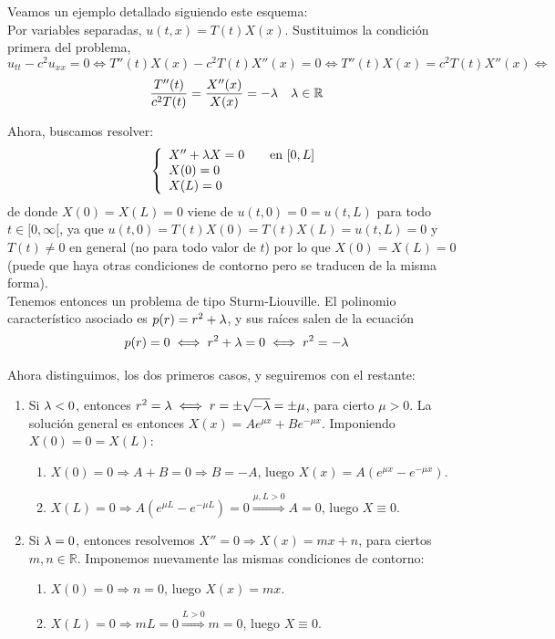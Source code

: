 \documentclass[12pt]{book}
\begin{document}
    Veamos un ejemplo detallado siguiendo este esquema: \\

    Por variables separadas, $u(t,x) = T(t) X(x)$. Sustituimos la condición primera del problema, 
    $$u_{tt} - c^2 u_{xx} = 0 \iff T''(t) X(x) - c^2 T(t) X''(x) = 0 \iff T''(t) X(x) = c^2 T(t) X''(x) \iff$$$$\dfrac{T''(t)}{c^2 T(t)} = \dfrac{X''(x)}{X(x)} = - \lambda \quad \lambda \in \mathbb{R}$$

    Ahora, buscamos resolver:
    \begin{equation*}
        \left\{\begin{array}{l}
            X'' + \lambda X = 0 \qquad \text{en\ } [0,L] \\
            X(0) = 0  \\
            X(L) = 0 
        \end{array}\right.
    \end{equation*}
    de donde $X(0)=X(L)=0$ viene de $u(t,0) = 0 = u(t,L)$ para todo $t\in[0,\infty[$, ya que $u(t,0)=T(t)X(0)=T(t)X(L)=u(t,L)=0$ y $T(t)\neq 0$ en general (no para todo valor de $t$) por lo que $X(0)=X(L)=0$ (puede que haya otras condiciones de contorno pero se traducen de la misma forma).\\

    Tenemos entonces un problema de tipo Sturm-Liouville. El polinomio característico asociado es $p(r) = r^2 + \lambda$, y sus raíces salen de la ecuación 
    $$p(r) = 0 \iff r^2 + \lambda = 0 \iff r^2 = - \lambda$$

    Ahora distinguimos, los dos primeros casos, y seguiremos con el restante:
    \begin{enumerate}
        \item Si $\lambda < 0$, entonces $r^2 = \lambda \iff r = \pm \sqrt{-\lambda} = \pm \mu$, para cierto $\mu > 0$.
        La solución general es entonces $X(x) = A e^{\mu x} + B e^{- \mu x}$. Imponiendo $X(0) = 0 = X(L)$:
        \begin{enumerate}
            \item $\boxed{X(0) = 0} \Longrightarrow A + B = 0 \Longrightarrow B = - A$, luego $X(x) = A(e^{\mu x} - e^{- \mu x})$.
            \item $\boxed{X(L) = 0} \Longrightarrow A(e^{\mu L} - e^{- \mu L}) = 0 \stackrel{\mu, L > 0}{\Longrightarrow} A = 0$, luego $X \equiv 0$.
        \end{enumerate}
        \item Si $\lambda = 0$, entonces resolvemos $X'' = 0 \Longrightarrow X(x) = mx + n$, para ciertos $m,n \in \mathbb{R}$. Imponemos nuevamente las mismas condiciones de contorno: 
        \begin{enumerate}
            \item $\boxed{X(0) = 0} \Longrightarrow n = 0$, luego $X(x) = mx$.
            \item $\boxed{X(L) = 0} \Longrightarrow mL = 0 \stackrel{L > 0}{\Longrightarrow} m = 0$, luego $X \equiv 0$.
        \end{enumerate}
    \end{enumerate}
\end{document}
